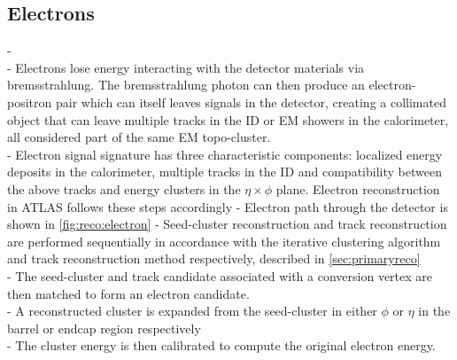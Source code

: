 \documentclass[../thesis.tex]{subfiles}
\begin{document}
\subsection{Electrons}
- \citep{reco:electron_id}\citep{reco:electron_meas}\\
- Electrons lose energy interacting with the detector materials via bremsstrahlung. The bremsstrahlung photon can then produce an electron-positron pair which can itself leaves signals in the detector, creating a collimated object that can leave multiple tracks in the ID or EM showers in the calorimeter, all considered part of the same EM topo-cluster.\\
- Electron signal signature has three characteristic components: localized energy deposits in the calorimeter, multiple tracks in the ID and compatibility between the above tracks and energy clusters in the $\eta \times \phi$ plane. Electron reconstruction in ATLAS follows these steps accordingly
- Electron path through the detector is shown in \autoref{fig:reco:electron}
- Seed-cluster reconstruction and track reconstruction are performed sequentially in accordance with the iterative clustering algorithm and track reconstruction method respectively, described in \autoref{sec:primaryreco}\\
- The seed-cluster and track candidate associated with a conversion vertex are then matched to form an electron candidate.\\
- A reconstructed cluster is expanded from the seed-cluster in either $\phi$ or $\eta$ in the barrel or endcap region respectively\\
- The cluster energy is then calibrated to compute the original electron energy.
\end{document}
